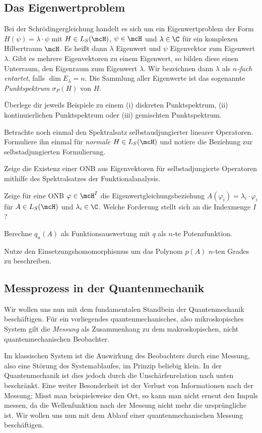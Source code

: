 \documentclass{subfiles}
\begin{document}
    \subsection{Das Eigenwertproblem}
        Bei der Schrödingergleichung handelt es sich um ein Eigenwertproblem der Form $H(\psi) = \lambda\cdot\psi$ mit $H\in L_S(\mcH)$, $\psi\in\mcH$ und $\lambda\in\C$ für ein komplexen Hilbertraum $\mcH$. Es heißt dann $\lambda$ Eigenwert und $\psi$ Eigenvektor zum Eigenwert $\lambda$. Gibt es mehrere Eigenvektoren zu einem Eigenwert, so bilden diese einen Unterraum, den Eigenraum zum Eigenwert $\lambda$. Wir bezeichnen dann $\lambda$ als \emph{$n$-fach entartet}, falls $\dim E_\lambda = n$. Die Sammlung aller Eigenwerte ist das sogenannte \emph{Punktspektrum} $\sigma_P(H)$ von $H$.
        \begin{Aufgabe}
            \nr{} Überlege dir jeweils Beispiele zu einem (i) diskreten Punktspektrum, (ii) kontinuierlichen Punktspektrum oder (iii) gemischten Punktspektrum. 

            \nr{} Betrachte noch einmal den Spektralsatz selbstaudjungierter linearer Operatoren. Formuliere ihn einmal für \emph{normale} $H\in L_S(\mcH)$ und notiere die Beziehung zur selbstadjungierten Formulierung. 

            \nr{} Zeige die Existenz einer ONB aus Eigenvektoren für selbstadjungierte Operatoren mithilfe des Spektralsatzes der Funktionalanalysis. 

            \nr{} Zeige für eine ONB $\varphi\in\mcH^I$ die Eigenwertgleichungsbeziehung $A(\varphi_i) = \lambda_i\cdot \varphi_i$ für $A\in L_S(\mcH)$ und $\lambda_i\in\C$. Welche Forderung stellt sich an die Indexmenge $I$?

            \nr{} Berechne $q_n(A)$ als Funktionsauswertung mit $q$ als $n$-te Potenzfunktion. 

            \nr{} Nutze den Einsetzungshomomorphismus um das Polynom $p(A)$ $n$-ten Grades zu beschreiben.
        \end{Aufgabe}

    \subsection{Messprozess in der Quantenmechanik}
        Wir wollen uns nun mit dem fundamentalen Standbein der Quantenmechanik beschäftigen. Für ein vorliegendes quantenmechanisches, also mikroskopisches System gilt die \emph{Messung} als Zusammenhang zu dem makroskopischen, nicht quantenmechanischen Beobachter. 
        
        Im klassischen System ist die Auswirkung des Beobachters durch eine Messung, also eine Störung des Systemablaufes, im Prinzip beliebig klein. In der Quantenmechanik ist dies jedoch durch die Unschärfenrelation nach unten beschränkt. Eine weiter Besonderheit ist der Verlust von Informationen nach der Messung; Misst man beispielsweise den Ort, so kann man nicht erneut den Impuls messen, da die Wellenfunktion nach der Messung nicht mehr die ursprüngliche ist. Wir wollen uns nun mit dem Ablauf einer quantenmechanischen Messung beschäftigen. 
        
\end{document}
